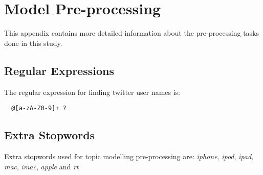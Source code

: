 \chapter{Model Pre-processing}
\label{cha:appx-model-preprocessing}
This appendix contains more detailed information about the pre-processing tasks done in this study.


\section{Regular Expressions}
\label{sec:appx-regular-expressions}
The regular expression for finding twitter user names is:
\begin{verbatim}
  @[a-zA-Z0-9]+ ?
\end{verbatim}

\section{Extra Stopwords}
\label{sec:appx-extra-stopwords}
Extra stopwords used for topic modelling pre-processing are: \textit{iphone}, \textit{ipod},
\textit{ipad}, \textit{mac}, \textit{imac}, \textit{apple} and \textit{rt}


